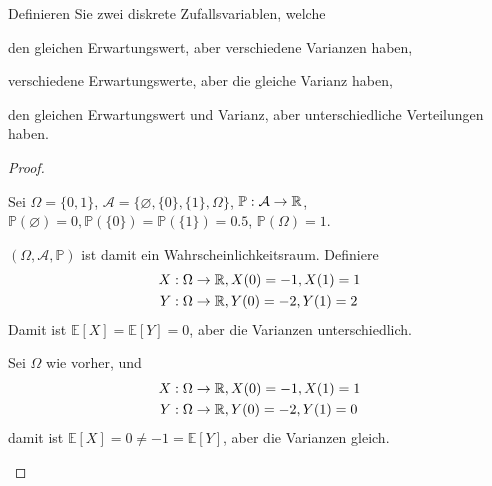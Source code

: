 \begin{Problem}
	Definieren Sie zwei diskrete Zufallsvariablen, welche	
	\begin{parts}
		\item den gleichen Erwartungswert, aber verschiedene Varianzen haben,
		\item verschiedene Erwartungswerte, aber die gleiche Varianz haben,
		\item den gleichen Erwartungswert und Varianz, aber unterschiedliche Verteilungen haben.
	\end{parts}
\end{Problem}

\begin{proof}
	\begin{parts}
		\item Sei $\Omega = \{0,1\}$, $\mathcal{A} = \{\varnothing, \{0\}, \{1\}, \Omega\}$, $\mathbb{P}: \mathcal{A} \to \mathbb{R}$, $\mathbb{P}(\varnothing)=0, \mathbb{P}(\{0\})=\mathbb{P}(\{1\})=0.5$, $\mathbb{P}(\Omega)=1$.
		
		$(\Omega, \mathcal{A}, \mathbb{P})$ ist damit ein Wahrscheinlichkeitsraum. Definiere
		\begin{align*}
			X&:\Omega \to \mathbb{R}, X(0)=-1, X(1) = 1\\
			Y&:\Omega\to \mathbb{R}, Y(0) = -2, Y(1) = 2
		\end{align*}
	Damit ist $\mathbb{E}[X]=\mathbb{E}[Y]=0$, aber die Varianzen unterschiedlich.
	\item Sei $\Omega$ wie vorher, und
			\begin{align*}
		X&:\Omega \to \mathbb{R}, X(0)=-1, X(1) = 1\\
		Y&:\Omega\to \mathbb{R}, Y(0) = -2, Y(1) = 0
	\end{align*}
damit ist $\mathbb{E}[X]=0\neq -1 =\mathbb{E}[Y]$, aber die Varianzen gleich.
	\end{parts}
\end{proof}

